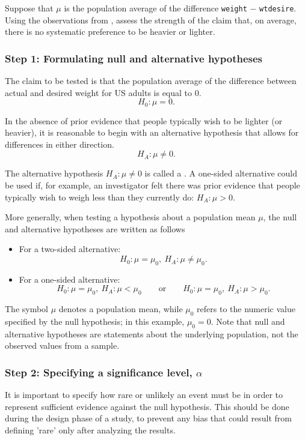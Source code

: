 Suppose that $\mu$ is the population average of the difference \texttt{weight} $-$ \texttt{wtdesire}. Using the observations from , assess the strength of the claim that, on average, there is no systematic preference to be heavier or lighter. 


\textD{\newpage}


\subsubsection{Step 1: Formulating null and alternative hypotheses}

The claim to be tested is that the population average of the difference between actual and desired weight for US adults is equal to 0. 
\[H_0: \mu = 0.\]

In the absence of prior evidence that people typically wish to be lighter (or heavier), it is reasonable to begin with an alternative hypothesis that allows for differences in either direction.
\[H_A: \mu \neq 0.\]

The alternative hypothesis $H_A: \mu \neq 0$ is called a . A one-sided alternative could be used if, for example, an investigator felt there was prior evidence that people typically wish to weigh less than they currently do: $H_A: \mu > 0$. 

More generally, when testing a hypothesis about a population mean $\mu$, the null and alternative hypotheses are written as follows
\begin{itemize}
\setlength{\itemsep}{0mm}
  \item For a two-sided alternative:
    \[H_0: \mu = \mu_0, \ H_A: \mu \neq \mu_0.\]    
  \item For a one-sided alternative:
    \[H_0: \mu = \mu_0, \ H_A: \mu < \mu_0
      \qquad\text{or}\qquad
      H_0: \mu = \mu_0, \  H_A: \mu > \mu_0.\]
\end{itemize}
The symbol $\mu$ denotes a population mean, while $\mu_0$ refers to the numeric value specified by the null hypothesis; in this example, $\mu_0 = 0$. Note that null and alternative hypotheses are statements about the underlying population, not the observed values from a sample. 

\subsubsection{Step 2: Specifying a significance level, $\alpha$}

It is important to specify how rare or unlikely an event must be in order to represent sufficient evidence against the null hypothesis. This should be done during the design phase of a study, to prevent any bias that could result from defining 'rare' only after analyzing the results. 

